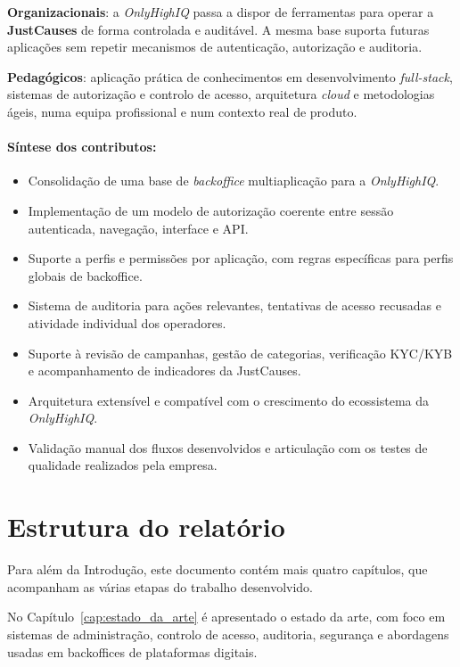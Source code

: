 \textbf{Organizacionais}: a \textit{OnlyHighIQ} passa a dispor de ferramentas para operar a \textbf{JustCauses} de forma controlada e auditável. A mesma base suporta futuras aplicações sem repetir mecanismos de autenticação, autorização e auditoria.

\textbf{Pedagógicos}: aplicação prática de conhecimentos em desenvolvimento \textit{full-stack}, sistemas de autorização e controlo de acesso, arquitetura \textit{cloud} e metodologias ágeis, numa equipa profissional e num contexto real de produto.

\paragraph{Síntese dos contributos:}
\begin{itemize}
    \item Consolidação de uma base de \textit{backoffice} multiaplicação para a \textit{OnlyHighIQ}.
    \item Implementação de um modelo de autorização coerente entre sessão autenticada, navegação, interface e \gls{API}.
    \item Suporte a perfis e permissões por aplicação, com regras específicas para perfis globais de backoffice.
    \item Sistema de auditoria para ações relevantes, tentativas de acesso recusadas e atividade individual dos operadores.
    \item Suporte à revisão de campanhas, gestão de categorias, verificação \gls{KYC}/\gls{KYB} e acompanhamento de indicadores da JustCauses.
    \item Arquitetura extensível e compatível com o crescimento do ecossistema da \textit{OnlyHighIQ}.
    \item Validação manual dos fluxos desenvolvidos e articulação com os testes de qualidade realizados pela empresa.
\end{itemize}


\section{Estrutura do relatório}
\label{sec:estrutura}

Para além da Introdução, este documento contém mais quatro capítulos, que acompanham as várias etapas do trabalho desenvolvido.

No Capítulo~\ref{cap:estado_da_arte} é apresentado o estado da arte, com foco em sistemas de administração, controlo de acesso, auditoria, segurança e abordagens usadas em backoffices de plataformas digitais.

